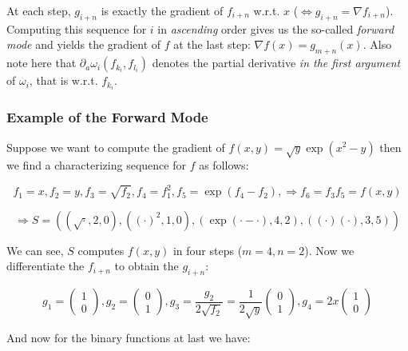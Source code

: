 \documentclass[11pt,a4paper]{article}
\theoremstyle{definition} %
\begin{document}
At each step, $g_{i+n}$ is exactly the gradient of $f_{i+n}$
w.r.t. $x$ ($\Leftrightarrow g_{i+n} = \nabla f_{i+n}$).
Computing this sequence for $i$ in \textit{ascending} order gives us
the so-called \textit{forward mode} and yields the gradient of $f$
at the last step: $\nabla f(x) = g_{m+n} (x)$. Also note here that
$\partial_a \omega_i (f_{k_i}, f_{l_i})$ denotes the partial derivative
\textit{in the first argument} of $\omega_i$, that is w.r.t. $f_{k_i}$.

\subsubsection{Example of the Forward Mode}
Suppose we want to compute the gradient of
$f(x, y) = \sqrt{y} \exp(x^2  - y)$
then we find a characterizing sequence for $f$ as follows:

\[
	f_1=x,
	f_2=y,
	f_3=\sqrt{f_2},
	f_4=f_1^2,
	f_5=\exp(f_4 - f_2),
	\Rightarrow f_6=f_3 f_5 = f(x, y)
\]

\[
	\Rightarrow S = \left(
	(\sqrt{\cdot}, 2, 0),
	((\cdot)^2, 1, 0),
	(\exp(\cdot - \cdot), 4, 2),
	((\cdot)(\cdot), 3, 5)
	\right)
\]

We can see, $S$ computes $f(x,y)$ in four steps ($m=4, n=2$).
Now we differentiate the $f_{i+n}$ to obtain the $g_{i+n}$:

\[
	g_1 = \begin{pmatrix} 1 \\ 0 \end{pmatrix},
	g_2 = \begin{pmatrix} 0 \\ 1 \end{pmatrix},
	g_3 =
	\frac{ g_2 }{ 2 \sqrt{f_2} } =
	\frac{ 1 }{ 2 \sqrt{y} } \begin{pmatrix} 0 \\ 1 \end{pmatrix},
	g_4 = 2 x \begin{pmatrix} 1 \\ 0 \end{pmatrix}
\]

And now for the binary functions at last we have:
\end{document}
